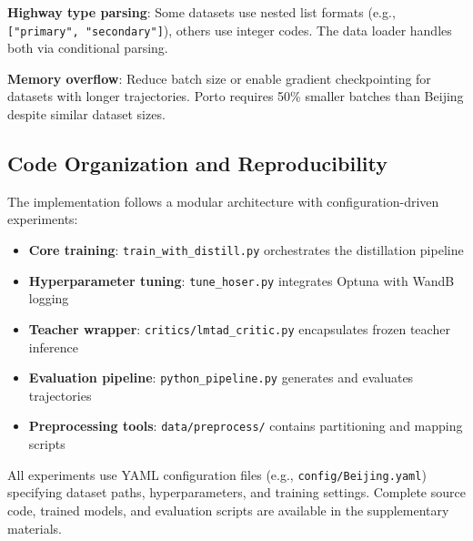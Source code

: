 \textbf{Highway type parsing}: Some datasets use nested list formats (e.g., \texttt{["primary", "secondary"]}), others use integer codes. The data loader handles both via conditional parsing.

\textbf{Memory overflow}: Reduce batch size or enable gradient checkpointing for datasets with longer trajectories. Porto requires 50\% smaller batches than Beijing despite similar dataset sizes.

\subsection{Code Organization and Reproducibility}
\label{sec:impl-code}

The implementation follows a modular architecture with configuration-driven experiments:

\begin{itemize}[noitemsep,topsep=0pt]
\item \textbf{Core training}: \texttt{train\_with\_distill.py} orchestrates the distillation pipeline
\item \textbf{Hyperparameter tuning}: \texttt{tune\_hoser.py} integrates Optuna with WandB logging
\item \textbf{Teacher wrapper}: \texttt{critics/lmtad\_critic.py} encapsulates frozen teacher inference
\item \textbf{Evaluation pipeline}: \texttt{python\_pipeline.py} generates and evaluates trajectories
\item \textbf{Preprocessing tools}: \texttt{data/preprocess/} contains partitioning and mapping scripts
\end{itemize}

All experiments use YAML configuration files (e.g., \texttt{config/Beijing.yaml}) specifying dataset paths, hyperparameters, and training settings. Complete source code, trained models, and evaluation scripts are available in the supplementary materials.

